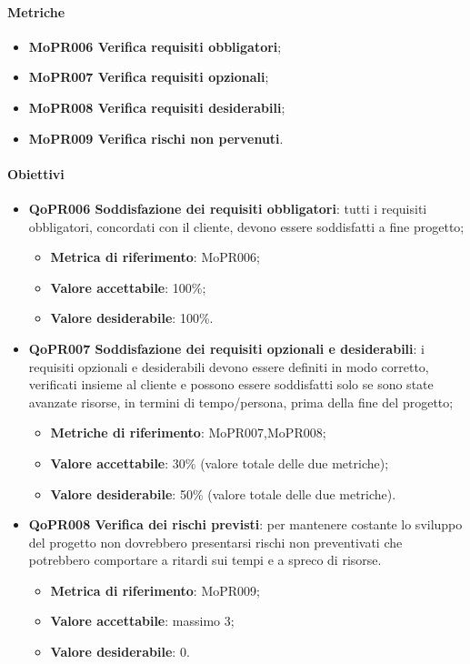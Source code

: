 \documentclass[../piano-di-qualifica.tex]{subfiles}
\begin{document}
\paragraph{Metriche}
\label{sub:metriche_2}
\begin{itemize}
    \item \textbf{MoPR006 Verifica requisiti obbligatori};
    \item \textbf{MoPR007 Verifica requisiti opzionali};
    \item \textbf{MoPR008 Verifica requisiti desiderabili};
    \item \textbf{MoPR009 Verifica rischi non pervenuti}.
\end{itemize}

\paragraph{Obiettivi}
\label{sub:obiettivi_2}
\begin{itemize}
    \item \textbf{QoPR006 Soddisfazione dei requisiti obbligatori}: tutti i requisiti obbligatori, concordati con il cliente, devono essere soddisfatti a fine progetto;
        \begin{itemize}
            \item \textbf{Metrica di riferimento}: MoPR006;
            \item \textbf{Valore accettabile}: 100\%; %
            \item \textbf{Valore desiderabile}: 100\%.
        \end{itemize}
    \item \textbf{QoPR007 Soddisfazione dei requisiti opzionali e desiderabili}: i requisiti opzionali e desiderabili devono essere definiti in modo corretto, verificati insieme al cliente e possono essere soddisfatti solo se sono state avanzate risorse, in termini di tempo/persona, prima della fine del progetto;
        \begin{itemize}
            \item \textbf{Metriche di riferimento}: MoPR007,MoPR008;
            \item \textbf{Valore accettabile}: 30\% (valore totale delle due metriche); %
            \item \textbf{Valore desiderabile}: 50\% (valore totale delle due metriche).
        \end{itemize}
    \item \textbf{QoPR008 Verifica dei rischi previsti}: per mantenere costante lo sviluppo del progetto non dovrebbero presentarsi rischi non preventivati che potrebbero comportare a ritardi sui tempi e a spreco di risorse.
        \begin{itemize}
            \item \textbf{Metrica di riferimento}: MoPR009;
            \item \textbf{Valore accettabile}: massimo 3; %
            \item \textbf{Valore desiderabile}: 0.
        \end{itemize}
\end{itemize}
\end{document}
